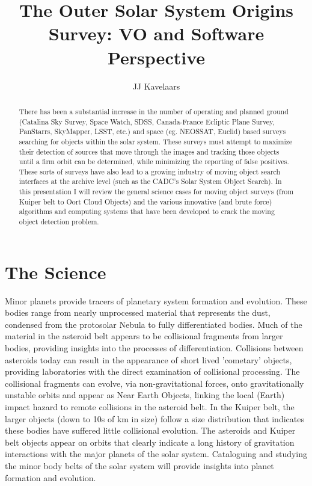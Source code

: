 
\resetcounters


 

\title{The Outer Solar System Origins Survey: VO and Software Perspective}
\author{JJ Kavelaars}


\begin{abstract}
There has been a substantial increase in the number of operating and planned ground (Catalina Sky Survey, Space Watch, SDSS, Canada-France Ecliptic Plane Survey, PanStarrs, SkyMapper, LSST, etc.) and space (eg. NEOSSAT, Euclid) based surveys searching for objects within the solar system. These surveys must attempt to maximize their detection of sources that move through the images and tracking those objects until a firm orbit can be determined, while minimizing the reporting of false positives. These sorts of surveys have also lead to a growing industry of moving object search interfaces at the archive level (such as the CADC's Solar System Object Search). In this presentation I will review the general science cases for moving object surveys (from Kuiper belt to Oort Cloud Objects) and the various innovative (and brute force) algorithms and computing systems that have been developed to crack the moving object detection problem.
\end{abstract}

\section{The Science}
Minor planets provide tracers of planetary system formation and evolution. 
These bodies range from nearly unprocessed material that represents the dust, condensed from the protosolar Nebula to fully differentiated bodies. Much of the material in the asteroid belt appears to be collisional fragments from larger bodies, providing insights into the processes of differentiation. Collisions between asteroids today can result in the appearance of short lived 'cometary' objects, providing laboratories with the direct examination of collisional processing. The collisional fragments can evolve, via non-gravitational forces, onto gravitationally unstable orbits and appear as Near Earth Objects, linking the local (Earth) impact hazard to remote collisions in the asteroid belt. In the Kuiper belt, the larger objects (down to 10s of km in size) follow a size distribution that indicates these bodies have suffered little collisional evolution.  The asteroids and Kuiper belt objects appear on orbits that clearly indicate a long history of gravitation interactions with the major planets of the solar system. Cataloguing and studying the minor body belts of the solar system will provide insights into planet formation and evolution.

